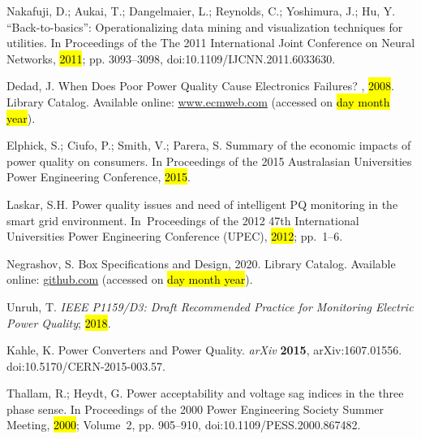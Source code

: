 \documentclass[energies,article,accept,moreauthors,pdftex]{Definitions/mdpi}
\begin{document}
\begin{thebibliography}{999}
Nakafuji, D.; Aukai, T.; Dangelmaier, L.; Reynolds, C.; Yoshimura, J.; {
Hu, Y}.
\newblock “{Back}-to-basics”: {Operationalizing} data mining and visualization
techniques for utilities.
\newblock In {Proceedings of the }The 2011 International Joint Conference on Neural Networks, \hl{2011}; pp. 3093--3098, doi:10.1109/IJCNN.2011.6033630.

Dedad, J.
\newblock When {Does} {Poor} {Power} {Quality} {Cause} {Electronics}
{Failures}?
, {\hl{2008}}.
\newblock Library Catalog.  Available online:  \url{www.ecmweb.com} (accessed on \hl{day month year}).

Elphick, S.; Ciufo, P.; Smith, V.; Parera, S.
\newblock Summary of the economic impacts of power quality on consumers.
\newblock  In {Proceedings of the }2015 {Australasian} {Universities} {Power} {Engineering}
{Conference}, \hl{2015}.

Laskar, S.H.
\newblock Power quality issues and need of intelligent {PQ} monitoring in the
smart grid environment.
\newblock In~{Proceedings of the }2012 47th
{International} Universities {Power} {Engineering} {Conference} ({UPEC}), \hl{2012}; pp.~1--6.

Negrashov, S.
 {Box} {Specifications} and {Design}, 2020.
\newblock Library Catalog.  Available online:  \url{github.com} (accessed on \hl{day month year}).

Unruh, T.
\newblock \emph{IEEE P1159/D3: {Draft} {Recommended} {Practice} for
{Monitoring} {Electric} {Power} {Quality}}; \hl{2018}. %

Kahle, K.
\newblock Power {Converters} and {Power} {Quality}.
\newblock \emph{arXiv} \textbf{2015}, arXiv:1607.01556. doi:10.5170/CERN-2015-003.57.


Thallam, R.; Heydt, G.
\newblock Power acceptability and voltage sag indices in the three phase sense.
\newblock In {Proceedings of the } 2000 {Power} {Engineering} {Society} {Summer} {Meeting}, 
 \hl{2000}; Volume~2, pp. 905--910, doi:10.1109/PESS.2000.867482.


\end{thebibliography}
\end{document}
